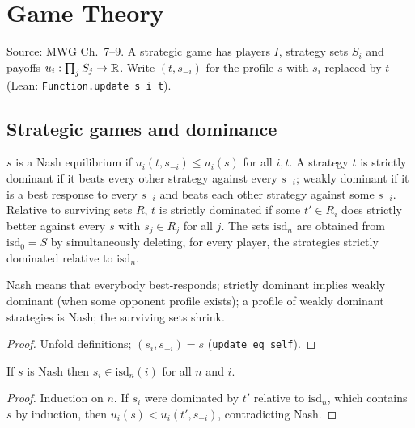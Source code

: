 \chapter{Game Theory}
\label{chap:games}

Source: MWG Ch.~7--9. A strategic game has players $I$, strategy sets $S_i$ and payoffs
$u_i : \prod_j S_j \to \mathbb{R}$. Write $(t, s_{-i})$ for the profile $s$ with $s_i$ replaced by $t$
(Lean: \texttt{Function.update s i t}).

\section{Strategic games and dominance}
\label{sec:strategic}

\begin{definition}
\label{def:nash}
\leanok
$s$ is a Nash equilibrium if $u_i(t, s_{-i}) \le u_i(s)$ for all $i, t$. A strategy $t$ is strictly dominant
if it beats every other strategy against every $s_{-i}$; weakly dominant if it is a best response to every
$s_{-i}$ and beats each other strategy against some $s_{-i}$. Relative to surviving sets $R$, $t$ is strictly dominated if
some $t' \in R_i$ does strictly better against every $s$ with $s_j \in R_j$ for all $j$. The sets
$\mathrm{isd}_n$ are obtained from $\mathrm{isd}_0 = S$ by simultaneously deleting, for every player,
the strategies strictly dominated relative to $\mathrm{isd}_n$.
\end{definition}

\begin{lemma}
\label{lem:nash-basic}
\leanok
{}
Nash means that everybody best-responds; strictly dominant implies weakly dominant (when some opponent
profile exists); a profile of weakly dominant strategies is Nash; the surviving sets
shrink.
\end{lemma}
\begin{proof}
\leanok
Unfold definitions; $(s_i, s_{-i}) = s$ (\texttt{update\_eq\_self}).
\end{proof}

\begin{theorem}
\label{thm:nash-isd}
\leanok
{}
If $s$ is Nash then $s_i \in \mathrm{isd}_n(i)$ for all $n$ and $i$.
\end{theorem}
\begin{proof}
\leanok
Induction on $n$. If $s_i$ were dominated by $t'$ relative to $\mathrm{isd}_n$, which contains $s$ by
induction, then $u_i(s) < u_i(t', s_{-i})$, contradicting Nash.
\end{proof}

